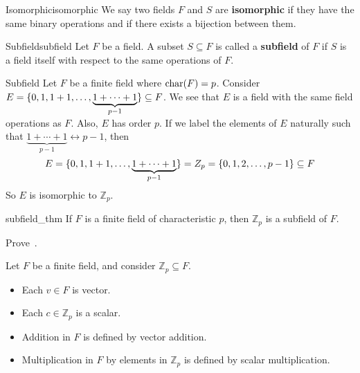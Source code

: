 
\begin{Definition}{Isomorphic}{isomorphic}
    We say two fields $F$ and $S$ are \textbf{isomorphic} if they have the same
    binary operations and if there exists a bijection between them.
\end{Definition}

\begin{Definition}{Subfield}{subfield}
    Let $ F $ be a field. A subset $ S\subseteq F $ is called a \textbf{subfield}
    of $ F $ if $ S $ is a field itself with respect to the same operations
    of $ F $.
\end{Definition}

\begin{Example}{Subfield}{}
    Let $ F $ be a finite field where $ \operatorname{char}(F)=p $. Consider
    $ E=\{0,1,1+1,\ldots,\underbrace{1+\cdots+1}_{p-1}\}\subseteq F $.
    We see that $ E $ is a field with the same field operations as $ F $.
    Also, $ E $ has order $ p $. If we label the elements of $ E $
    naturally such that $ \underbrace{1+\cdots+1}_{p-1}
        \longleftrightarrow p-1 $,
    then
    \[ E=\{0,1,1+1,\ldots,\underbrace{1+\cdots+1}_{p-1}\}
        = \relax{Z}_p= \{0,1,2,\ldots ,p-1\}\subseteq F \]
    So $ E $ is isomorphic to $ \mathbb{Z}_p $.
\end{Example}

\begin{Theorem}{}{subfield_thm}
    If $ F $ is a finite field of characteristic $ p $, then
    $ \mathbb{Z}_p $ is a subfield of $ F $.
\end{Theorem}

\begin{Exercise}{}{}
    Prove~.
\end{Exercise}

\begin{Definition}{}{}
    Let $ F $ be a finite field, and consider $ \mathbb{Z}_p\subseteq F $.
    \begin{itemize}
        \item Each $ v\in F $ is vector.
        \item Each $ c\in\mathbb{Z}_p $ is a scalar.
        \item Addition in $ F $ is defined by vector addition.
        \item Multiplication in $ F $ by elements in $ \mathbb{Z}_p $
              is defined by scalar multiplication.
    \end{itemize}
\end{Definition}

